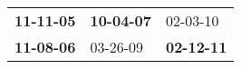 \begin{supertabular}{p{0.33\columnwidth}p{0.33\columnwidth}p{0.33\columnwidth}}
 \textbf{11-11-05\textsuperscript{}} &  \textbf{10-04-07\textsuperscript{}} &           02-03-10\textsuperscript{} \\
 \textbf{11-08-06\textsuperscript{}} &           03-26-09\textsuperscript{} &  \textbf{02-12-11\textsuperscript{}} \\
\end{supertabular}
